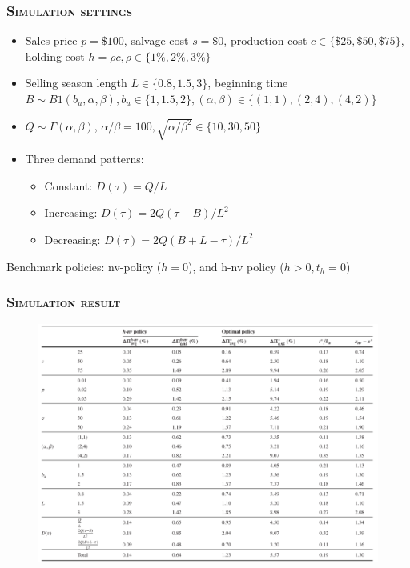 \documentclass[aspectratio=169]{../presentation}
\begin{document}
    \begin{frame}
        \frametitle{\textsc{Simulation settings}}

        \begin{itemize}
            \item Sales price $p=\$100$, salvage cost $s = \$0$, production cost $c\in \{\$25, \$50, \$75\}$, holding cost $h = \rho c, \rho\in \{1\%, 2\%, 3\%\}$
            \item Selling season length $L\in \{0.8, 1.5, 3\}$, beginning time $B\sim B1(b_u, \alpha, \beta), b_u\in \{1, 1.5, 2\}, (\alpha, \beta)\in \{(1, 1), (2, 4), (4, 2)\}$
            \item $Q\sim \Gamma(\alpha, \beta)$, $\alpha/\beta = 100, \sqrt{\alpha / \beta^2} \in \{10, 30, 50\}$
            \item Three demand patterns:
            \begin{itemize}
                \item Constant: $D(\tau) = Q/L$
                \item Increasing: $D(\tau) = 2Q(\tau - B)/L^2$
                \item Decreasing: $D(\tau) = 2Q(B + L - \tau)/L^2$
            \end{itemize}
        \end{itemize}

        Benchmark policies: nv-policy ($h = 0$), and h-nv policy ($h > 0, t_h = 0$)

    \end{frame}

    \begin{frame}
        \frametitle{\textsc{Simulation result}}

        \begin{figure}[ht]
            \includegraphics[width=0.65\linewidth]{imgs/gp01-2.png}
        \end{figure}

    \end{frame}
\end{document}
